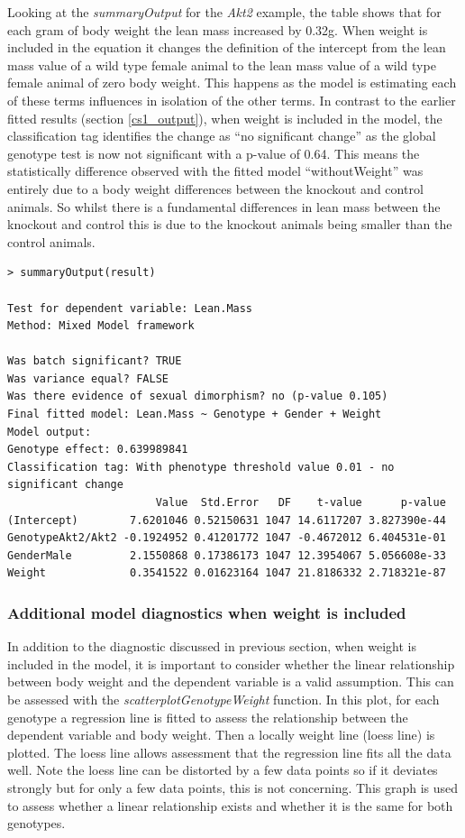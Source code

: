 \documentclass[12pt,a4paper]{article}
\begin{document}
Looking at the \textit{summaryOutput} for the \textit{Akt2} example, the table shows that for each gram of body weight the lean mass increased by 0.32g.  
When weight is included in the equation it changes the definition of the intercept from the lean mass value of a wild type female animal to the lean mass value of a wild type female animal of zero body weight. 
This happens as the model is estimating each of these terms influences in isolation of the other terms. 
In contrast to the earlier fitted results (section \ref{cs1_output}), when weight is included in the model, the classification tag identifies the change as “no significant change” 
as the global genotype test is now not significant with a p-value of 0.64.  
This means the statistically difference observed with the fitted model “withoutWeight” was entirely due to a body weight differences between the knockout and control animals.  
So whilst there is a fundamental differences in lean mass between the knockout and control this is due to the knockout animals being smaller than the control animals. 

\begingroup
    \fontsize{8pt}{12pt}\selectfont
\begin{verbatim}
> summaryOutput(result)

Test for dependent variable: Lean.Mass
Method: Mixed Model framework

Was batch significant? TRUE
Was variance equal? FALSE
Was there evidence of sexual dimorphism? no (p-value 0.105)
Final fitted model: Lean.Mass ~ Genotype + Gender + Weight
Model output:
Genotype effect: 0.639989841
Classification tag: With phenotype threshold value 0.01 - no significant change
                       Value  Std.Error   DF    t-value      p-value
(Intercept)        7.6201046 0.52150631 1047 14.6117207 3.827390e-44
GenotypeAkt2/Akt2 -0.1924952 0.41201772 1047 -0.4672012 6.404531e-01
GenderMale         2.1550868 0.17386173 1047 12.3954067 5.056608e-33
Weight             0.3541522 0.01623164 1047 21.8186332 2.718321e-87

\end{verbatim}
\endgroup


\subsubsection{Additional model diagnostics when weight is included}
In addition to the diagnostic discussed in previous section, when weight is included in the model, it is important to consider whether the linear relationship between body weight and the dependent variable is a valid assumption. 
This can be assessed with the \textit{scatterplotGenotypeWeight} function. 
In this plot, for each genotype a regression line is fitted to assess the relationship between the dependent variable and body weight. 
Then a locally weight line (loess line) is plotted. 
The loess line allows assessment that the regression line fits all the data well.
Note the loess line can be distorted by a few data points so if it deviates strongly but for only a few data points, this is not concerning.  
This graph is used to assess whether a linear relationship exists and whether it is the same for both genotypes.  
\end{document}
